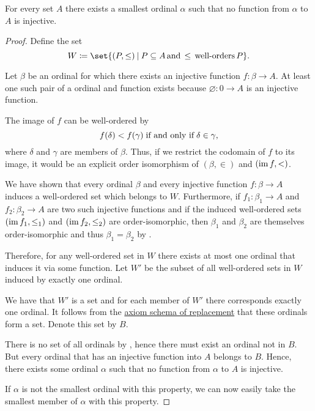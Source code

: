 \begin{theorem}\label{thm:hartogs_lemma}
  For every set \( A \) there exists a smallest ordinal \( \alpha \) such that no function from \( \alpha \) to \( A \) is injective.
\end{theorem}
\begin{proof}
  Define the set
  \begin{equation*}
    W \coloneqq \set{ (P, \leq) \given P \subseteq A \T*{and} \leq \T*{well-orders} P }.
  \end{equation*}

  Let \( \beta \) be an ordinal for which there exists an injective function \( f: \beta \to A \). At least one such pair of a ordinal and function exists because \( \varnothing: 0 \to A \) is an injective function.

  The image of \( f \) can be well-ordered by
  \begin{equation*}
    f(\delta) < f(\gamma) \T{if and only if} \delta \in \gamma,
  \end{equation*}
  where \( \delta \) and \( \gamma \) are members of \( \beta \). Thus, if we restrict the codomain of \( f \) to its image, it would be an explicit order isomorphism of \( (\beta, \in) \) and \( (\operatorname{im} f, <) \).

  We have shown that every ordinal \( \beta \) and every injective function \( f: \beta \to A \) induces a well-ordered set which belongs to \( W \). Furthermore, if \( f_1: \beta_1 \to A \) and \( f_2: \beta_2 \to A \) are two such injective functions and if the induced well-ordered sets \( (\operatorname{im} f_1, \leq_1) \) and \( (\operatorname{im} f_2, \leq_2) \) are order-isomorphic, then \( \beta_1 \) and \( \beta_2 \) are themselves order-isomorphic and thus \( \beta_1 = \beta_2 \) by .

  Therefore, for any well-ordered set in \( W \) there exists at most one ordinal that induces it via some function. Let \( W' \) be the subset of all well-ordered sets in \( W \) induced by exactly one ordinal.

  We have that \( W' \) is a set and for each member of \( W' \) there corresponds exactly one ordinal. It follows from the \hyperref[def:zfc/replacement]{axiom schema of replacement} that these ordinals form a set. Denote this set by \( B \).

  There is no set of all ordinals by , hence there must exist an ordinal not in \( B \). But every ordinal that has an injective function into \( A \) belongs to \( B \). Hence, there exists some ordinal \( \alpha \) such that no function from \( \alpha \) to \( A \) is injective.

  If \( \alpha \) is not the smallest ordinal with this property, we can now easily take the smallest member of \( \alpha \) with this property.
\end{proof}

